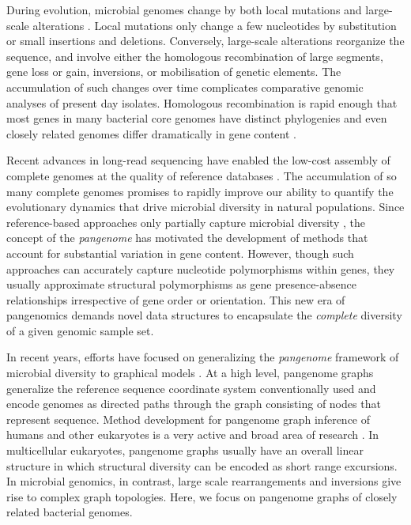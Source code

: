 \documentclass[aps,rmp,preprint,superscriptaddress,10pt,linenumbers]{revtex4-1}
\begin{document}
\maketitle

During evolution, microbial genomes change by both local mutations and large-scale alterations \cite{arnold2021horizontal}.
Local mutations only change a few nucleotides by substitution or small insertions and deletions.
Conversely, large-scale alterations reorganize the sequence, and involve either the homologous recombination of large segments, gene loss or gain, inversions, or mobilisation of genetic elements.
The accumulation of such changes over time complicates comparative genomic analyses of present day isolates.
Homologous recombination is rapid enough that most genes in many bacterial core genomes have distinct phylogenies \cite{sakoparnig2021whole} and even closely related genomes differ dramatically in gene content \cite{touchon2020phylogenetic,touchon2009organised,doolittle2009origin}.

Recent advances in long-read sequencing have enabled the low-cost assembly of complete genomes at the quality of reference databases \cite{whibley2021changing}.
The accumulation of so many complete genomes promises to rapidly improve our ability to quantify the evolutionary dynamics that drive microbial diversity in natural populations.
Since reference-based approaches only partially capture microbial diversity \cite{tettelin2008comparative}, the concept of the \emph{pangenome} has motivated the development of methods that account for substantial variation in gene content.
However, though such approaches can accurately capture nucleotide polymorphisms within genes, they usually approximate structural polymorphisms as gene presence-absence relationships \cite{page2015roary,ding2018panx} irrespective of gene order or orientation.
This new era of pangenomics demands novel data structures to encapsulate the \emph{complete} diversity of a given genomic sample set.

In recent years, efforts have focused on generalizing the \emph{pangenome} framework of microbial diversity to graphical models \cite{eizenga2020pangenome}.
At a high level, pangenome graphs generalize the reference sequence coordinate system conventionally used and encode genomes as directed paths through the graph consisting of nodes that represent sequence.
Method development for pangenome graph inference of humans and other eukaryotes is a very active and broad area of research \cite{eizenga2020pangenome}. 
In multicellular eukaryotes, pangenome graphs usually have an overall linear structure in which structural diversity can be encoded as short range excursions.
In microbial genomics, in contrast, large scale rearrangements and inversions give rise to complex graph topologies.
Here, we focus on pangenome graphs of closely related bacterial genomes.
\end{document}
